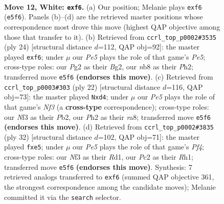 \documentclass[11pt]{article}
\begin{document}
\clearpage

\begin{figure}[p]\centering
\begin{subfigure}{0.46\textwidth}\centering
\resizebox{\linewidth}{!}{%
\newchessgame
\chessboard[
  setfen={rn1k1bnr/pp4pp/4pp2/1B1pPbB1/3p4/N4N2/P1P2PPP/2R1K2R w K - 0 12},
  showmover=false,
  pgfstyle=straightmove, color=movearrow, markmove={e5-f6}
]}
\caption{}
\end{subfigure}\hfill
\begin{subfigure}{0.46\textwidth}\centering
\resizebox{\linewidth}{!}{%
\newchessgame
\chessboard[
  setfen={rnbr2k1/pp4bp/2p2pp1/4P1Bn/8/2N2NP1/PPP3BP/R3K2R w KQ - 0 13},
  showmover=false,
  pgfstyle=straightmove, color=movearrow, markmove={e5-f6}
]}
\caption{}
\end{subfigure}
\\[4pt]
\begin{subfigure}{0.46\textwidth}\centering
\resizebox{\linewidth}{!}{%
\newchessgame
\chessboard[
  setfen={r1b1k2r/1p2bppp/p1n2p2/8/3p4/2PBBN2/PP3PPP/R3K2R w KQkq - 0 12},
  showmover=false,
  pgfstyle=straightmove, color=movearrow, markmove={f3-d4}
]}
\caption{}
\end{subfigure}\hfill
\begin{subfigure}{0.46\textwidth}\centering
\resizebox{\linewidth}{!}{%
\newchessgame
\chessboard[
  setfen={rn2kb1r/1n1b1ppp/4p3/pB2p3/1pPN1PP1/8/PP1BN2P/2KR3R w kq - 0 17},
  showmover=false,
  pgfstyle=straightmove, color=movearrow, markmove={f4-e5}
]}
\caption{}
\end{subfigure}
\caption{\textbf{Move 12, White: \texttt{exf6}.} (a) Our position; Melanie plays \texttt{exf6} (\texttt{e5f6}). Panels (b)--(d) are the retrieved master positions whose correspondence most drove this move (highest QAP objective among those that transfer to it). (b) Retrieved from \texttt{ccrl\_top\_p0002\#3535} (ply 24) [structural distance $d$=112, QAP obj=92]: the master played \texttt{exf6}; under $\mu$ our \emph{Pe5} plays the role of that game's \emph{Pe5}; cross-type roles: our \emph{P}g2 as their \emph{B}g2, our \emph{n}b8 as their \emph{P}h2; transferred move \texttt{e5f6} \textbf{(endorses this move)}. (c) Retrieved from \texttt{ccrl\_top\_p0003\#303} (ply 22) [structural distance $d$=116, QAP obj=73]: the master played \texttt{Nxd4}; under $\mu$ our \emph{Pe5} plays the role of that game's \emph{Nf3} (a \textbf{cross-type} correspondence); cross-type roles: our \emph{N}f3 as their \emph{P}b2, our \emph{P}h2 as their \emph{r}a8; transferred move \texttt{e5f6} \textbf{(endorses this move)}. (d) Retrieved from \texttt{ccrl\_top\_p0002\#3835} (ply 32) [structural distance $d$=102, QAP obj=71]: the master played \texttt{fxe5}; under $\mu$ our \emph{Pe5} plays the role of that game's \emph{Pf4}; cross-type roles: our \emph{N}f3 as their \emph{R}d1, our \emph{P}c2 as their \emph{R}h1; transferred move \texttt{e5f6} \textbf{(endorses this move)}. Synthesis: 7 retrieved analogs transferred to \texttt{exf6} (summed QAP objective 361, the strongest correspondence among the candidate moves); Melanie committed it via the \texttt{search} selector.}
\label{fig:thought-m22}
\end{figure}
\end{document}

